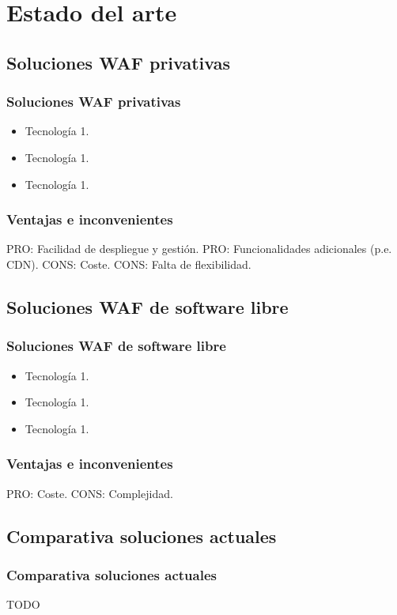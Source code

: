 \section{Estado del arte}


\subsection{Soluciones WAF privativas}
\begin{frame}[shrink]
  \frametitle{Soluciones WAF privativas}
  \begin{itemize}
    \item Tecnología 1.
    \item Tecnología 1.
    \item Tecnología 1.
  \end{itemize}
\end{frame}

\begin{frame}[shrink]
  \frametitle{Ventajas e inconvenientes}
  PRO: Facilidad de despliegue y gestión.
  PRO: Funcionalidades adicionales (p.e. CDN).
  CONS: Coste.
  CONS: Falta de flexibilidad.
\end{frame}

\subsection{Soluciones WAF de software libre}
\begin{frame}[shrink]
  \frametitle{Soluciones WAF de software libre}
  \begin{itemize}
    \item Tecnología 1.
    \item Tecnología 1.
    \item Tecnología 1.
  \end{itemize}
\end{frame}

\begin{frame}[shrink]
  \frametitle{Ventajas e inconvenientes}
  PRO: Coste.
  CONS: Complejidad.
\end{frame}

\subsection{Comparativa soluciones actuales}
\begin{frame}[shrink]
  \frametitle{Comparativa soluciones actuales}
  TODO
\end{frame}
